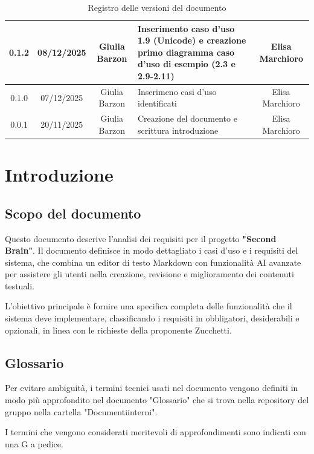 \documentclass[11pt,a4paper]{article}
\begin{document}
\begin{table}[H]
\begin{tabular}{|c|c|c|>{\raggedright\arraybackslash}p{}|c|}
        \hline
        0.1.2 & 08/12/2025 & Giulia Barzon & Inserimento caso d'uso 1.9 (Unicode) e creazione primo diagramma caso d'uso di esempio (2.3 e 2.9-2.11) & Elisa Marchioro\\
        \hline
        0.1.0 & 07/12/2025 & Giulia Barzon & Inserimeno casi d'uso identificati & Elisa Marchioro\\
        \hline
        0.0.1 & 20/11/2025 & Giulia Barzon & Creazione del documento e scrittura introduzione & Elisa Marchioro\\
        \hline
    \end{tabular}
    \caption{Registro delle versioni del documento}
    \label{tab:versionamento}
\end{table}

\newpage

\tableofcontents
\thispagestyle{empty}
\newpage

\setcounter{page}{1}

\section{Introduzione}
\subsection{Scopo del documento}
Questo documento descrive l'analisi dei requisiti per il progetto \textbf{"Second Brain"}. Il documento definisce in modo dettagliato i casi d'uso e i requisiti del sistema, che combina un editor di testo Markdown con funzionalità AI avanzate per assistere gli utenti nella creazione, revisione e miglioramento dei contenuti testuali.

L'obiettivo principale è fornire una specifica completa delle funzionalità che il sistema deve implementare, classificando i requisiti in obbligatori, desiderabili e opzionali, in linea con le richieste della proponente Zucchetti.

\subsection{Glossario}
Per evitare ambiguità, i termini tecnici usati nel documento vengono definiti in modo più approfondito nel documento "Glossario" che si trova nella repository del gruppo nella cartella "Documenti\textunderscore interni".

I termini che vengono considerati meritevoli di approfondimenti sono indicati con una G a pedice.
\end{document}
